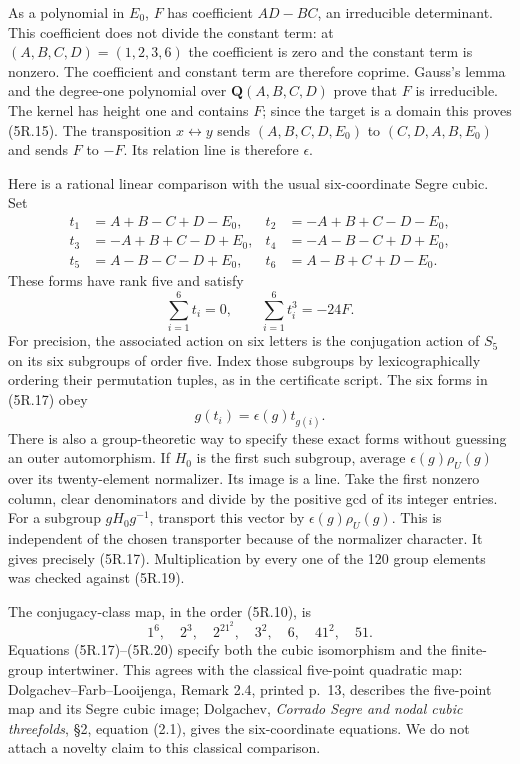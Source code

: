 \documentclass[
  10pt,
]{article}
\begin{document}
As a polynomial in \(E_0\), \(F\) has coefficient \(AD-BC\), an
irreducible determinant. This coefficient does not divide the constant
term: at \((A,B,C,D)=(1,2,3,6)\) the coefficient is zero and the
constant term is nonzero. The coefficient and constant term are
therefore coprime. Gauss's lemma and the degree-one polynomial over
\(\mathbf Q(A,B,C,D)\) prove that \(F\) is irreducible. The kernel has
height one and contains \(F\); since the target is a domain this proves
(5R.15). The transposition \(x\leftrightarrow y\) sends
\((A,B,C,D,E_0)\) to \((C,D,A,B,E_0)\) and sends \(F\) to \(-F\). Its
relation line is therefore \(\epsilon\).

Here is a rational linear comparison with the usual six-coordinate Segre
cubic. Set \[
\begin{aligned}
t_1&= A+B-C+D-E_0,&t_2&=-A+B+C-D-E_0,\\
t_3&=-A+B+C-D+E_0,&t_4&=-A-B-C+D+E_0,\\
t_5&= A-B-C-D+E_0,&t_6&= A-B+C+D-E_0.
\end{aligned}
\tag{5R.17}
\] These forms have rank five and satisfy \[
\sum_{i=1}^6t_i=0,\qquad\sum_{i=1}^6t_i^3=-24F.
\tag{5R.18}
\] For precision, the associated action on six letters is the
conjugation action of \(S_5\) on its six subgroups of order five. Index
those subgroups by lexicographically ordering their permutation tuples,
as in the certificate script. The six forms in (5R.17) obey \[
g(t_i)=\epsilon(g)t_{g(i)}.
\tag{5R.19}
\] There is also a group-theoretic way to specify these exact forms
without guessing an outer automorphism. If \(H_0\) is the first such
subgroup, average \(\epsilon(g)\rho_U(g)\) over its twenty-element
normalizer. Its image is a line. Take the first nonzero column, clear
denominators and divide by the positive gcd of its integer entries. For
a subgroup \(gH_0g^{-1}\), transport this vector by
\(\epsilon(g)\rho_U(g)\). This is independent of the chosen transporter
because of the normalizer character. It gives precisely (5R.17).
Multiplication by every one of the 120 group elements was checked
against (5R.19).

The conjugacy-class map, in the order (5R.10), is \[
1^6,\quad2^3,\quad2^21^2,\quad3^2,\quad6,\quad41^2,\quad51.
\tag{5R.20}
\] Equations (5R.17)--(5R.20) specify both the cubic isomorphism and the
finite-group intertwiner. This agrees with the classical five-point
quadratic map: Dolgachev--Farb--Looijenga, Remark 2.4, printed p.~13,
describes the five-point map and its Segre cubic image; Dolgachev,
\emph{Corrado Segre and nodal cubic threefolds}, §2, equation (2.1),
gives the six-coordinate equations. We do not attach a novelty claim to
this classical comparison.
\end{document}
